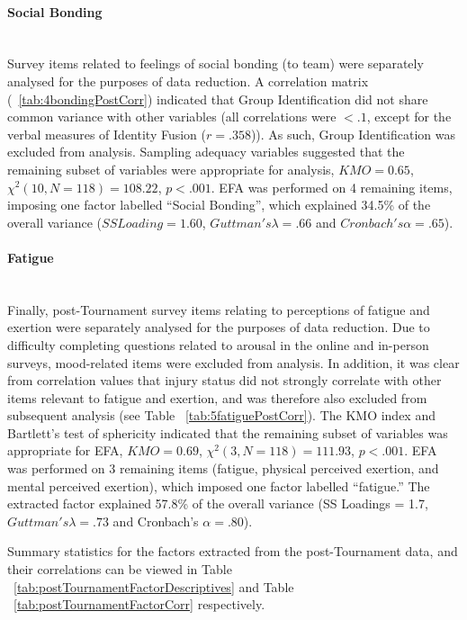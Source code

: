 \documentclass[12pt]{report}
\newcommand{\myparagraph}[1]{\paragraph{#1}\mbox{}\\}
\begin{document}
{\myparagraph{Social Bonding}
Survey items related to feelings of social bonding (to team) were separately analysed for the purposes of data reduction. A correlation matrix (~\ref{tab:4bondingPostCorr}) indicated that Group Identification did not share common variance with other variables (all correlations were $<.1$, except for the verbal measures of Identity Fusion ($r =.358$)). As such,  Group Identification was excluded from analysis.  Sampling adequacy variables suggested that the remaining subset of variables were appropriate for analysis, $KMO = 0.65$, $\chi^2(10, N = 118) = 108.22$, $p < .001$.  EFA was performed on 4 remaining items, imposing one factor labelled ``Social Bonding'', which explained 34.5\% of the overall variance ($SS Loading = 1.60$, $Guttman's \lambda =.66$ and $Cronbach's \alpha = .65$).

\myparagraph{Fatigue}
Finally, post-Tournament survey items relating to perceptions of fatigue and exertion were separately analysed for the purposes of data reduction.  Due to difficulty completing questions related to arousal in the online and in-person surveys, mood-related items were excluded from analysis.  In addition, it was clear from correlation values that injury status did not strongly correlate with other items relevant to fatigue and exertion, and was therefore also excluded from subsequent analysis (see Table ~\ref{tab:5fatiguePostCorr}).  The KMO index and Bartlett's test of sphericity indicated that the remaining subset of variables was appropriate for EFA, $KMO =  0.69$, $\chi^2(3, N = 118) = 111.93$, $p < .001$. EFA was performed on 3 remaining items (fatigue, physical perceived exertion, and mental perceived exertion), which imposed one factor labelled ``fatigue.''  The extracted factor explained 57.8\% of the overall variance (SS Loadings = 1.7, $Guttman's\lambda =.73$ and Cronbach's $\alpha = .80$).

Summary statistics for the factors extracted from the post-Tournament data, and their correlations can be viewed in Table ~\ref{tab:postTournamentFactorDescriptives} and Table ~\ref{tab:postTournamentFactorCorr} respectively.

\newpage
{} %
\begin{landscape}






\clearpage





\end{landscape}}
\end{document}

